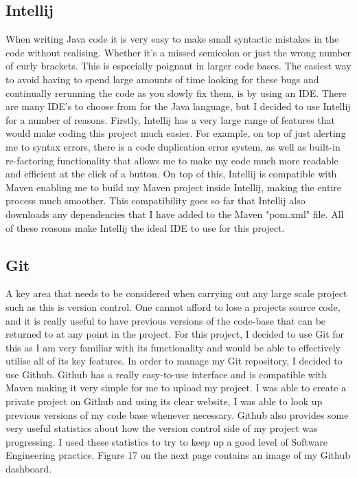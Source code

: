 \subsection{Intellij \label{intellij}}

When writing Java code it is very easy to make small syntactic mistakes in the code without realising. Whether it's a missed semicolon or just the wrong number of curly brackets. This is especially poignant in larger code bases. The easiest way to avoid having to spend large amounts of time looking for these bugs and continually rerunning the code as you slowly fix them, is by using an IDE. There are many IDE's to choose from for the Java language, but I decided to use Intellij for a number of reasons. Firstly, Intellij has a very large range of features that would make coding this project much easier. For example, on top of just alerting me to syntax errors, there is a code duplication error system, as well as built-in re-factoring functionality that allows me to make my code much more readable and efficient at the click of a button. On top of this, Intellij is compatible with Maven enabling me to build my Maven project inside Intellij, making the entire process much smoother. This compatibility goes so far that Intellij also downloads any dependencies that I have added to the Maven "pom.xml" file. All of these reasons make Intellij the ideal IDE to use for this project.

\subsection{Git \label{git}}

A key area that needs to be considered when carrying out any large scale project such as this is version control. One cannot afford to lose a projects source code, and it is really useful to have previous versions of the code-base that can be returned to at any point in the project. For this project, I decided to use Git for this as I am very familiar with its functionality and would be able to effectively utilise all of its key features. In order to manage my Git repository, I decided to use Github. Github has a really easy-to-use interface and is compatible with Maven making it very simple for me to upload my project. I was able to create a private project on Github and using its clear website, I was able to look up previous versions of my code base whenever necessary. Github also provides some very useful statistics about how the version control side of my project was progressing. I used these statistics to try to keep up a good level of Software Engineering practice. Figure 17 on the next page contains an image of my Github dashboard.

